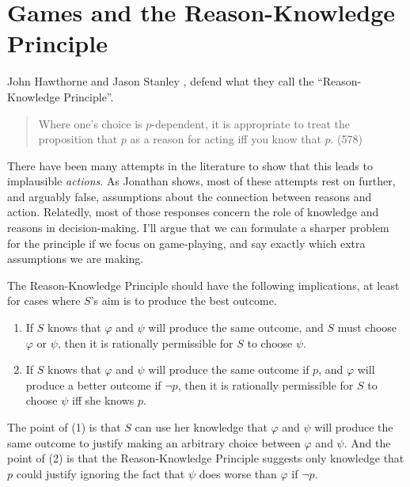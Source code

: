 \chapter[Games and Reason-Knowledge]{Games and the Reason-Knowledge Principle}


John Hawthorne and Jason Stanley \citeyearpar{Hawthorne2008-HAWKAA}, defend what they call the ``Reason-Knowledge Principle''.

\begin{quote}
Where one's choice is $p$-dependent, it is appropriate to treat the proposition that $p$ as a reason for acting iff you know that $p$. (578)
\end{quote}

\noindent There have been many attempts in the literature to show that this leads to implausible \textit{actions}. As  Jonathan \citet{Ichikawa2012} shows, most of these attempts rest on further, and arguably false, assumptions about the connection between  reasons and action. Relatedly, most of those responses concern the role of knowledge and reasons in decision-making. I'll argue that we can formulate a sharper problem for the principle if we focus on game-playing, and say exactly which extra assumptions we are making.

The Reason-Knowledge Principle should have the following implications, at least for cases where $S$'s aim is to produce the best outcome.

\begin{enumerate}
\renewcommand{\labelenumi}{(\arabic{enumi})}
\item If $S$ knows that $\varphi$ and $\psi$ will produce the same outcome, and $S$ must choose $\varphi$ or $\psi$, then it is rationally permissible for $S$ to choose $\psi$.
\item If $S$ knows that $\varphi$ and $\psi$ will produce the same outcome if $p$, and $\varphi$ will produce a better outcome if $\neg p$, then it is rationally permissible for $S$ to choose $\psi$ iff she knows $p$.
\end{enumerate} 

\noindent The point of (1) is that $S$ can use her knowledge that $\varphi$ and $\psi$ will produce the same outcome to justify making an arbitrary choice between $\varphi$ and $\psi$. And the point of (2) is that the Reason-Knowledge Principle suggests only knowledge that $p$ could justify ignoring the fact that $\psi$ does worse than $\varphi$ if $\neg p$.

